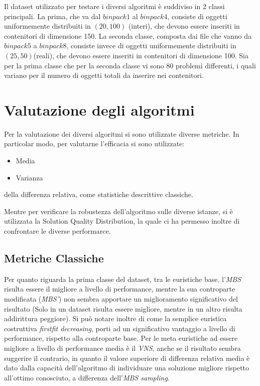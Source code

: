 \documentclass{article}
\begin{document}
Il dataset utilizzato\cite{Falkenauer} per testare i diversi algoritmi è suddiviso in 2 classi principali. La prima, che va dal $binpack1$ al $binpack4$, consiste di oggetti uniformemente distribuiti in $(20, 100)$ (interi), che devono essere inseriti in contenitori di dimensione 150. La seconda classe, composta dai file che vanno da $binpack5$ a $binpack8$, consiste invece di oggetti uniformemente distribuiti in $(25, 50)$(reali), che devono essere inseriti in contenitori di dimensione 100.
\newline
\newline
Sia per la prima classe che per la seconda classe vi sono 80 problemi differenti, i quali variano per il numero di oggetti totali da inserire nei contenitori.

\section{Valutazione degli algoritmi}

Per la valutazione dei diversi algoritmi si sono utilizzate diverse metriche. In particolar modo, per valutarne l'efficacia si sono utilizzate:

\begin{itemize}
\item Media
\item Varianza
\end{itemize}
della differenza relativa, come statistiche descrittive classiche.

Mentre per verificare la robustezza dell'algoritmo sulle diverse istanze, si è utilizzata la Solution Quality Distribution, la quale ci ha permesso inoltre di confrontare le diverse performarce.

\subsection{Metriche Classiche}
Per quanto riguarda la prima classe del dataset, tra le euristiche base, l'\textit{MBS} risulta essere il migliore a livello di performance, mentre la sua controparte modificata (\textit{MBS'}) non sembra apportare un miglioramento significativo del risultato (Solo in un dataset risulta essere migliore, mentre in un altro risulta addirittura peggiore).  
\newline
\newline
Si può notare inoltre di come la semplice euristica costruttiva \textit{firstfit decreasing}, porti ad un significativo vantaggio a livello di performance, rispetto alla controparte base.
\newline
\newline
Per le meta euristiche ad essere migliore a livello di performance media è il \textit{VNS}, anche se il risultato sembra suggerire il contrario, in quanto il valore superiore di differenza relativa media è dato dalla capacità dell'algoritmo di individuare una soluzione migliore rispetto all'ottimo conosciuto, a differenza dell'\textit{MBS sampling}.
\end{document}
